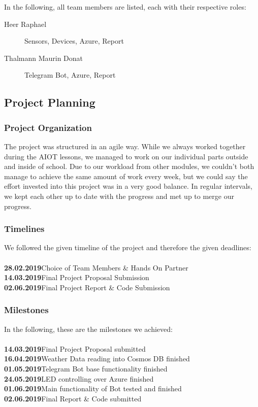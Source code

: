 \documentclass[a4paper]{article}
\begin{document}
			In the following, all team members are listed, each with their respective roles:
			
			\begin{description}
				\item[Heer Raphael] Sensors, Devices, Azure, Report
				\item[Thalmann Maurin Donat] Telegram Bot, Azure, Report
			\end{description}
		
		\subsection{Project Planning}
		
			\subsubsection{Project Organization}
			
			The project was structured in an agile way.
			While we always worked together during the AIOT lessons, we managed to work on our individual parts outside and inside of school.
			Due to our workload from other modules, we couldn't both manage to achieve the same amount of work every week, but we could say the effort invested into this project was in a very good balance.
			In regular intervals, we kept each other up to date with the progress and met up to merge our progress.
			
			\subsubsection{Timelines}
			
			We followed the given timeline of the project and therefore the given deadlines:\\
			\\
			\textbf{28.02.2019}\quad Choice of Team Members \& Hands On Partner \\
			\textbf{14.03.2019}\quad Final Project Proposal Submission \\
			\textbf{02.06.2019}\quad Final Project Report \& Code Submission \\
			
			\subsubsection{Milestones}
			
			In the following, these are the milestones we achieved: \\
			\\
			\textbf{14.03.2019}\quad Final Project Proposal submitted \\
			\textbf{16.04.2019}\quad Weather Data reading into Cosmos DB finished \\
			\textbf{01.05.2019}\quad Telegram Bot base functionality finished \\
			\textbf{24.05.2019}\quad LED controlling over Azure finished \\
			\textbf{01.06.2019}\quad Main functionality of Bot tested and finished \\
			\textbf{02.06.2019}\quad Final Report \& Code submitted \\
			
\end{document}
